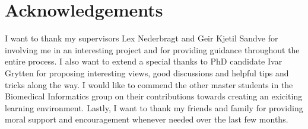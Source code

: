 \documentclass[thesis.tex]{subfiles}
\begin{document}
\chapter*{Acknowledgements}
I want to thank my supervisors Lex Nederbragt and Geir Kjetil Sandve for involving me in an interesting project and for providing guidance throughout the entire process. I also want to extend a special thanks to PhD candidate Ivar Grytten for proposing interesting views, good discussions and helpful tips and tricks along the way. I would like to commend the other master students in the Biomedical Informatics group on their contributions towards creating an exiciting learning environment. Lastly, I want to thank my friends and family for providing moral support and encouragement whenever needed over the last few months.
\end{document}
